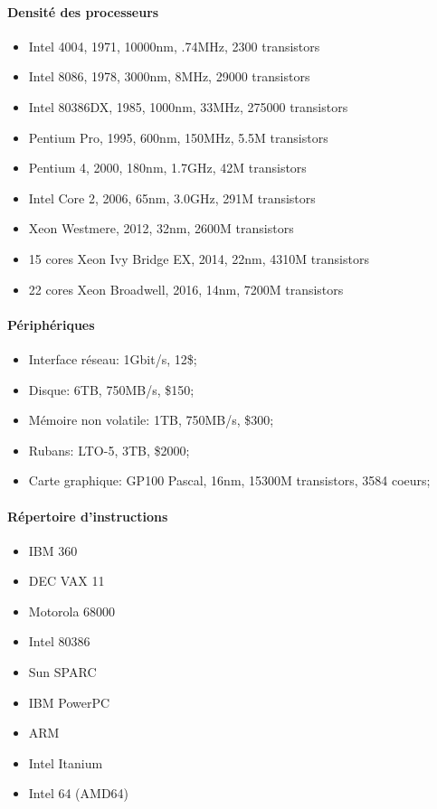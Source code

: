\documentclass[oneside]{book}
\begin{document}
\paragraph{Densité des processeurs}
\begin{itemize}
\item Intel 4004, 1971, 10000nm, .74MHz, 2300 transistors
\item Intel 8086, 1978, 3000nm, 8MHz, 29000 transistors
\item Intel 80386DX, 1985, 1000nm, 33MHz, 275000 transistors
\item Pentium Pro, 1995, 600nm, 150MHz, 5.5M transistors
\item Pentium 4, 2000, 180nm, 1.7GHz, 42M transistors
\item Intel Core 2, 2006, 65nm, 3.0GHz, 291M transistors
\item Xeon Westmere, 2012, 32nm, 2600M transistors
\item 15 cores Xeon Ivy Bridge EX, 2014, 22nm, 4310M transistors
\item 22 cores Xeon Broadwell, 2016, 14nm, 7200M transistors
\end{itemize}
\paragraph{Périphériques}
\begin{itemize}
\item Interface réseau: 1Gbit/s, 12\$;
\item Disque: 6TB, 750MB/s, \$150;
\item Mémoire non volatile: 1TB, 750MB/s, \$300;
\item Rubans: LTO-5, 3TB, \$2000;
\item Carte graphique: GP100 Pascal, 16nm, 15300M
transistors, 3584 coeurs;
\end{itemize}
\paragraph{Répertoire d'instructions}
\begin{itemize}
\item IBM 360
\item DEC VAX 11
\item Motorola 68000
\item Intel 80386
\item Sun SPARC
\item IBM PowerPC
\item ARM
\item Intel Itanium
\item Intel 64 (AMD64)
\end{itemize}
\end{document}

